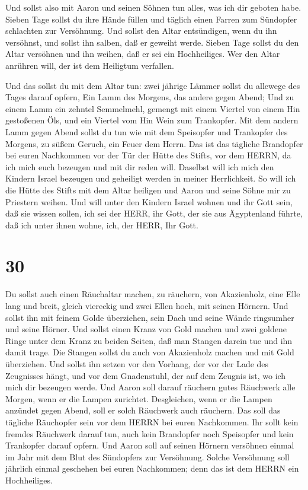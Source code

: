  Und sollst also mit Aaron und seinen Söhnen tun alles, was
ich dir geboten habe. Sieben Tage sollst du ihre Hände füllen
 und täglich einen Farren zum Sündopfer schlachten zur
Versöhnung. Und sollst den Altar entsündigen, wenn du ihn versöhnst, und
sollst ihn salben, daß er geweiht werde.  Sieben Tage
sollst du den Altar versöhnen und ihn weihen, daß er sei ein
Hochheiliges. Wer den Altar anrühren will, der ist dem Heiligtum
verfallen.

 Und das sollst du mit dem Altar tun: zwei jährige Lämmer
sollst du allewege des Tages darauf opfern,  Ein Lamm des
Morgens, das andere gegen Abend;  Und zu einem Lamm ein
zehntel Semmelmehl, gemengt mit einem Viertel von einem Hin gestoßenen
Öls, und ein Viertel vom Hin Wein zum Trankopfer.  Mit dem
andern Lamm gegen Abend sollst du tun wie mit dem Speisopfer und
Trankopfer des Morgens, zu süßem Geruch, ein Feuer dem Herrn.
 Das ist das tägliche Brandopfer bei euren Nachkommen vor
der Tür der Hütte des Stifts, vor dem HERRN, da ich mich euch bezeugen
und mit dir reden will.  Daselbst will ich mich den Kindern
Israel bezeugen und geheiligt werden in meiner Herrlichkeit.
 So will ich die Hütte des Stifts mit dem Altar heiligen
und Aaron und seine Söhne mir zu Priestern weihen.  Und
will unter den Kindern Israel wohnen und ihr Gott sein, 
daß sie wissen sollen, ich sei der HERR, ihr Gott, der sie aus
Ägyptenland führte, daß ich unter ihnen wohne, ich, der HERR, Ihr Gott.

\hypertarget{section-29}{%
\section{30}\label{section-29}}

 Du sollst auch einen Räuchaltar machen, zu räuchern, von
Akazienholz,  eine Elle lang und breit, gleich viereckig und
zwei Ellen hoch, mit seinen Hörnern.  Und sollst ihn mit
feinem Golde überziehen, sein Dach und seine Wände ringsumher und seine
Hörner. Und sollst einen Kranz von Gold machen  und zwei
goldene Ringe unter dem Kranz zu beiden Seiten, daß man Stangen darein
tue und ihn damit trage.  Die Stangen sollst du auch von
Akazienholz machen und mit Gold überziehen.  Und sollst ihn
setzen vor den Vorhang, der vor der Lade des Zeugnisses hängt, und vor
dem Gnadenstuhl, der auf dem Zeugnis ist, wo ich mich dir bezeugen
werde.  Und Aaron soll darauf räuchern gutes Räuchwerk alle
Morgen, wenn er die Lampen zurichtet.  Desgleichen, wenn er
die Lampen anzündet gegen Abend, soll er solch Räuchwerk auch räuchern.
Das soll das tägliche Räuchopfer sein vor dem HERRN bei euren
Nachkommen.  Ihr sollt kein fremdes Räuchwerk darauf tun,
auch kein Brandopfer noch Speisopfer und kein Trankopfer darauf opfern.
 Und Aaron soll auf seinen Hörnern versöhnen einmal im Jahr
mit dem Blut des Sündopfers zur Versöhnung. Solche Versöhnung soll
jährlich einmal geschehen bei euren Nachkommen; denn das ist dem HERRN
ein Hochheiliges.

